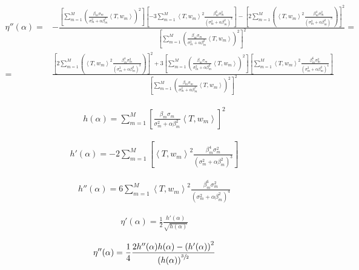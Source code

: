 \documentclass[a4paper,10pt]{article}
\theoremstyle{plain}
\theoremstyle{definition}
\theoremstyle{remark}
\newcommand{\pa}[1]{\left(#1\right)}
\newcommand{\ang}[1]{\left<#1\right>}
\newcommand{\bra}[1]{\left[#1\right]}
\begin{document}
\begin{align*}
  \eta '' (\alpha) = & - \frac{ \bra{ \sum _{m=1} ^M \pa{ \frac{ \beta
          _m \sigma _m}{\sigma _m ^2 + \alpha \beta _m ^2} \ang{T,w_m}
      } ^2} \bra{ -3 \sum _{m=1} ^M \ang{T,w_m}^2 \frac{\beta _m ^6
        \sigma _m ^2 }{ \pa { \sigma _m ^2 + \alpha \beta _m ^2 } ^4 }
    } - \bra{2\sum _{m=1} ^M \pa{\ang{T,w_m}^2 \frac{ \beta _m ^4
          \sigma _m ^2 }{\pa{\sigma _m ^2 + \alpha \beta _m ^2} ^3 }
      }}^2 } { \bra{ \sum _{m=1} ^M \pa{ \frac{ \beta _m \sigma
          _m}{\sigma _m ^2 + \alpha \beta _m ^2}
        \ang{T,w_m} } ^2}^2 } = \\
  =& \frac{ \bra{2\sum _{m=1} ^M \pa{\ang{T,w_m}^2 \frac{ \beta _m
          ^4 \sigma _m ^2 }{\pa{\sigma _m ^2 + \alpha \beta _m ^2} ^3
        } }}^2 +3 \bra{ \sum _{m=1} ^M \pa{ \frac{ \beta _m \sigma
          _m}{\sigma _m ^2 + \alpha \beta _m ^2} \ang{T,w_m} } ^2}
    \bra{ \sum _{m=1} ^M \ang{T,w_m}^2 \frac{\beta _m ^6 \sigma _m ^2
      }{ \pa { \sigma _m ^2 + \alpha \beta _m ^2 } ^4 } } } { \bra{
      \sum _{m=1} ^M \pa{ \frac{ \beta _m \sigma _m}{\sigma _m ^2 +
          \alpha \beta _m ^2} \ang{T,w_m} } ^2}^2 }
\end{align*}

\begin{align*}
  h(\alpha) = \sum _{m=1} ^M \bra{ \frac{ \beta _m \sigma _m}{\sigma
      _m ^2 + \alpha \beta _m ^2} \ang{T,w_m} } ^2
\end{align*}

\begin{align*}
  h'(\alpha) = - 2 \sum _{m=1} ^M \bra{\ang{T,w_m}^2 \frac{ \beta _m
      ^4 \sigma _m ^2 }{\pa{\sigma _m ^2 + \alpha \beta _m ^2} ^3 } }
\end{align*}

\begin{align*}
  h''(\alpha) = 6 \sum _{m=1} ^M \ang{T,w_m}^2 \frac{\beta _m ^6 \sigma _m ^2
      }{ \pa { \sigma _m ^2 + \alpha \beta _m ^2 } ^4 }
\end{align*}

\begin{align*}
  \eta '(\alpha) = \frac{1}{2} \frac{h'(\alpha)}{\sqrt{h(\alpha)}}
\end{align*}

\begin{align*}
  \eta ''(\alpha) = \frac{1}{4} \frac{2 h''(\alpha) h(\alpha) - \pa{
      h'(\alpha)} ^2 }{\pa{h(\alpha)} ^{\sfrac{3}{2}}}
\end{align*}
\end{document}
